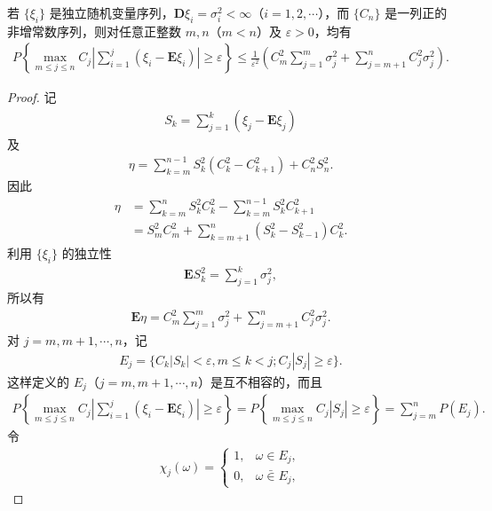\documentclass[../../main.tex]{subfiles}
\begin{document}
\begin{theorem}\label{theorem:ch05-HajekRenyi}
若 $\{\xi_i\}$ 是独立随机变量序列，$\boldsymbol{D}\xi_i=\sigma_i^{2}<\infty$（$i=1,2,\cdots$），而 $\{C_n\}$ 是一列正的非增常数序列，则对任意正整数 $m,n$（$m<n$）及 $\varepsilon>0$，均有
\begin{align}
P\!\left\{\max_{m\leqslant j\leqslant n}C_j\left|\sum_{i=1}^{j}(\xi_i-\boldsymbol{E}\xi_i)\right|\geqslant\varepsilon\right\}
\leqslant\frac{1}{\varepsilon^{2}}\left(C_m^{2}\sum_{j=1}^{m}\sigma_j^{2}+\sum_{j=m+1}^{n}C_j^{2}\sigma_j^{2}\right).
\end{align}
\end{theorem}

\begin{proof}
记
\begin{align*}
S_k=\sum_{j=1}^{k}(\xi_j-\boldsymbol{E}\xi_j)
\end{align*}
及
\begin{align}
\eta=\sum_{k=m}^{n-1}S_k^{2}(C_k^{2}-C_{k+1}^{2})+C_n^{2}S_n^{2}.
\end{align}
因此
\begin{align*}
\eta&=\sum_{k=m}^{n}S_k^{2}C_k^{2}-\sum_{k=m}^{n-1}S_k^{2}C_{k+1}^{2}\\
&=S_m^{2}C_m^{2}+\sum_{k=m+1}^{n}(S_k^{2}-S_{k-1}^{2})C_k^{2}.
\end{align*}
利用 $\{\xi_i\}$ 的独立性
\begin{align*}
\boldsymbol{E}S_k^{2}=\sum_{j=1}^{k}\sigma_j^{2},
\end{align*}
所以有
\begin{align}
\boldsymbol{E}\eta=C_m^{2}\sum_{j=1}^{m}\sigma_j^{2}+\sum_{j=m+1}^{n}C_j^{2}\sigma_j^{2}.
\end{align}
对 $j=m,m+1,\cdots,n$，记
\begin{align}
E_j=\{C_k|S_k|<\varepsilon,m\leqslant k<j;C_j|S_j|\geqslant\varepsilon\}.
\end{align}
这样定义的 $E_j$（$j=m,m+1,\cdots,n$）是互不相容的，而且
\begin{align}
P\!\left\{\max_{m\leqslant j\leqslant n}C_j\left|\sum_{i=1}^{j}(\xi_i-\boldsymbol{E}\xi_i)\right|\geqslant\varepsilon\right\}
=P\!\left\{\max_{m\leqslant j\leqslant n}C_j|S_j|\geqslant\varepsilon\right\}
=\sum_{j=m}^{n}P(E_j).
\end{align}
令
\begin{align}
\chi_j(\omega)=
\begin{cases}
1,&\omega\in E_j,\\
0,&\omega\bar{\in}E_j,

\end{cases}
\end{align}
\end{proof}
\end{document}
